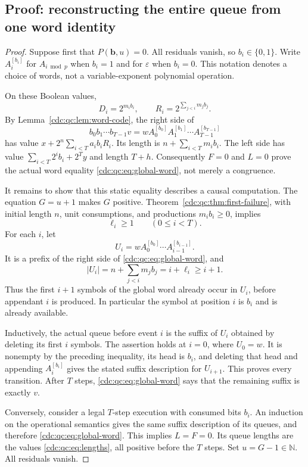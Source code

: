 \documentclass[11pt,a4paper]{article}
\theoremstyle{definition}
\theoremstyle{remark}
\newcommand{\N}{\mathbb N}
\newcommand{\eps}{\varepsilon}
\begin{document}
\subsection{Proof: reconstructing the entire queue from one word identity}
\begin{proof}
Suppose first that $P(\mathbf b,u)=0$. All residuals vanish, so $b_i\in\{0,1\}$. Write $A_i^{[b_i]}$ for $A_{i\bmod p}$ when $b_i=1$ and for $\eps$ when $b_i=0$. This notation denotes a choice of words, not a variable-exponent polynomial operation.

On these Boolean values,
\[
 D_i=2^{m_i b_i},\qquad R_i=2^{\sum_{j<i}m_jb_j}.
\]
By Lemma~\ref{cdc:qc:lem:word-code}, the right side of
\begin{equation}\label{cdc:qc:eq:global-word}
 b_0b_1\cdots b_{T-1}v
   =wA_0^{[b_0]}A_1^{[b_1]}\cdots A_{T-1}^{[b_{T-1}]}
\end{equation}
has value $x+2^n\sum_{i<T}a_i b_iR_i$. Its length is $n+\sum_{i<T}m_i b_i$. The left side has value $\sum_{i<T}2^i b_i+2^Ty$ and length $T+h$. Consequently $F=0$ and $L=0$ prove the actual word equality \eqref{cdc:qc:eq:global-word}, not merely a congruence.

It remains to show that this static equality describes a causal computation. The equation $G=u+1$ makes $G$ positive. Theorem~\ref{cdc:qc:thm:first-failure}, with initial length $n$, unit consumptions, and productions $m_i b_i\geq0$, implies
\begin{equation}\label{cdc:qc:eq:positive-lengths}
 \ell_i\geq1\qquad(0\leq i<T).
\end{equation}
For each $i$, let
\[
 U_i=wA_0^{[b_0]}\cdots A_{i-1}^{[b_{i-1}]}.
\]
It is a prefix of the right side of \eqref{cdc:qc:eq:global-word}, and
\[
 |U_i|=n+\sum_{j<i}m_jb_j=i+\ell_i\geq i+1.
\]
Thus the first $i+1$ symbols of the global word already occur in $U_i$, before appendant $i$ is produced. In particular the symbol at position $i$ is $b_i$ and is already available.

Inductively, the actual queue before event $i$ is the suffix of $U_i$ obtained by deleting its first $i$ symbols. The assertion holds at $i=0$, where $U_0=w$. It is nonempty by the preceding inequality, its head is $b_i$, and deleting that head and appending $A_i^{[b_i]}$ gives the stated suffix description for $U_{i+1}$. This proves every transition. After $T$ steps, \eqref{cdc:qc:eq:global-word} says that the remaining suffix is exactly $v$.

Conversely, consider a legal $T$-step execution with consumed bits $b_i$. An induction on the operational semantics gives the same suffix description of its queues, and therefore \eqref{cdc:qc:eq:global-word}. This implies $L=F=0$. Its queue lengths are the values \eqref{cdc:qc:eq:lengths}, all positive before the $T$ steps. Set $u=G-1\in\N$. All residuals vanish.


\end{proof}
\end{document}
